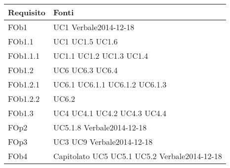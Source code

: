\begin{longtable}{|l|p{4cm}|}
\hline
\textbf{Requisito} & \textbf{Fonti} \\
\hline
FOb1 & UC1 \linebreak Verbale2014-12-18 \linebreak \\ 
\hline
FOb1.1 & UC1 \linebreak  UC1.5 \linebreak  UC1.6 \linebreak  \\ 
\hline
FOb1.1.1 & UC1.1 \linebreak  UC1.2 \linebreak  UC1.3 \linebreak  UC1.4 \linebreak  \\ 
\hline
FOb1.2 & UC6 \linebreak  UC6.3 \linebreak  UC6.4 \linebreak  \\ 
\hline
FOb1.2.1 & UC6.1 \linebreak  UC6.1.1 \linebreak  UC6.1.2 \linebreak  UC6.1.3 \linebreak  \\ 
\hline
FOb1.2.2 & UC6.2 \linebreak  \\ 
\hline
FOb1.3 & UC4 \linebreak  UC4.1 \linebreak  UC4.2 \linebreak  UC4.3 \linebreak  UC4.4 \linebreak  \\ 
\hline
FOp2 & UC5.1.8 \linebreak Verbale2014-12-18 \linebreak \\ 
\hline
FOp3 & UC3 \linebreak UC9 \linebreak Verbale2014-12-18 \linebreak \\ 
\hline
FOb4 & Capitolato \linebreak UC5 \linebreak UC5.1 \linebreak UC5.2 \linebreak Verbale2014-12-18 \linebreak \\ 

\end{longtable}
